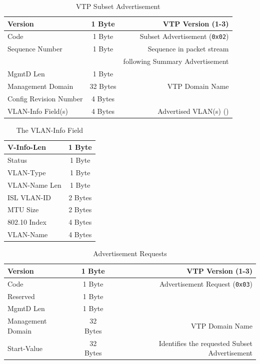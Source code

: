 \documentclass[12pt]{article}
\begin{document}
	\begin{table}[H]
	\centering
	\caption{VTP Subset Advertisement \label{tab:VTP SUBSET}}
	\begin{tabular}{| l | c | r |}\hline
	Version				& 1 Byte	& VTP Version (1-3)\\\hline
	Code					& 1 Byte	& Subset Advertisement (\texttt{0x02})\\\hline
	Sequence Number		& 1 Byte	& Sequence in packet stream\\
						&		& following Summary Advertisement\\\hline
	MgmtD Len				& 1 Byte	&\\\hline
	Management Domain		& 32 Bytes	& VTP Domain Name\\\hline
	Config Revision Number	& 4 Bytes	&\\\hline
	VLAN-Info Field(s)		& 4 Bytes	& Advertised VLAN(s) (\Cref{tab:VTP VLAN})\\\hline
	\end{tabular}\end{table}

	\begin{table}[H]
	\centering
	\caption{The VLAN-Info Field \label{tab:VTP VLAN}}
	\begin{tabular}{| l | c |}\hline
	V-Info-Len				& 1 Byte\\\hline
	Status				& 1 Byte\\\hline
	VLAN-Type				& 1 Byte\\\hline
	VLAN-Name Len			& 1 Byte\\\hline
	ISL VLAN-ID			& 2 Bytes\\\hline
	MTU Size				& 2 Bytes\\\hline
	802.10 Index			& 4 Bytes\\\hline
	VLAN-Name			& 4 Bytes\\\hline
	\end{tabular}\end{table}

	\begin{table}[H]
	\centering
	\caption{Advertisement Requests \label{tab:VTP REQUEST}}
	\begin{tabular}{| l | c | r |}\hline
	Version				& 1 Byte	& VTP Version (1-3)\\\hline
	Code					& 1 Byte	& Advertisement Request (\texttt{0x03})\\\hline
	Reserved				& 1 Byte	&\\\hline
	MgmtD Len				& 1 Byte	&\\\hline
	Management Domain		& 32 Bytes	& VTP Domain Name\\\hline
	Start-Value				& 32 Bytes	& Identifies the requested Subset Advertisement\\\hline
	\end{tabular}\end{table}
\end{document}

